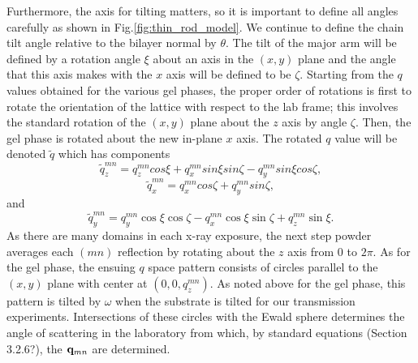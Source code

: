 Furthermore, the axis for tilting matters, so it is important to define all 
angles carefully as shown in Fig.\ref{fig:thin_rod_model}.  
We continue to define the chain tilt angle relative to the 
bilayer normal by $\theta$.  The tilt of the major arm will be defined by a 
rotation angle $\xi$ about an axis in the $(x,y)$ plane and the angle that 
this axis makes with the $x$ axis will be defined to be $\zeta$.  Starting 
from the $q$ values obtained for the various gel phases, the proper order of 
rotations is first to rotate the orientation of the lattice with respect to 
the lab frame; this involves the standard rotation of the $(x,y)$ plane about 
the $z$ axis by angle $\zeta$.  Then, the gel phase is rotated about the new 
in-plane $x$ axis. The rotated $q$ value will be denoted $\tilde{q}$ which 
has components
\begin{equation}\label{qtz}
\tilde{q}_{z}^{mn}=q_{z}^{mn}cos{\xi}+q_{x}^{mn}sin{\xi}sin{\zeta}-q_{y}^{mn}sin{\xi}cos{\zeta},
\end{equation}
\begin{equation}\label{qtx}
\tilde{q}_{x}^{mn}=q_{x}^{mn}cos{\zeta}+q_{y}^{mn}sin{\zeta},
\end{equation}
and
\begin{equation}\label{qty}
  \tilde{q}_{y}^{mn} = q_{y}^{mn}\cos\xi\cos\zeta -
                       q_{x}^{mn}\cos\xi\sin\zeta +
                       q_{z}^{mn}\sin\xi.
\end{equation}
As there are many domains in each x-ray exposure, the next step powder averages 
each $(mn)$ reflection by rotating about the $z$ axis from $0$ to $2\pi$.  
As for the gel phase, the ensuing $q$ space pattern consists of circles parallel 
to the $(x,y)$ plane with center at $(0,0,q_z^{mn})$.  As noted above for the 
gel phase, this pattern is tilted by $\omega$ when the substrate is tilted for 
our transmission experiments.  Intersections of these circles with the Ewald 
sphere determines the angle of scattering in the laboratory from which, by 
standard equations (Section 3.2.6?), the $\bold{q}_{mn}$ are determined.  

